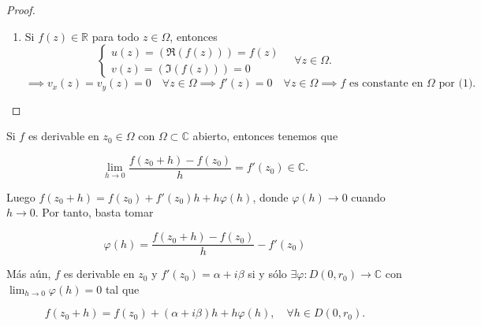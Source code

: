 \begin{proof}
\begin{enumerate}
\begin{itemize}
\[\begin{cases}
                    u(z) v(z) u_y(z) + v(z)^2 u_x(z) = 0 
                \end{cases}
            \]
            \[
                \implies u_x(z) (u^2(z) + v^2(z)) = 0 \implies u_x(z) c^2 = 0 \underbrace{\implies}_{c \neq 0} u_x(z) = 0 \quad \forall z \in \Omega.
            \]
            Análogamente, $v_x(z) = 0$ para todo $z \in \Omega$. Por lo tanto, $f'(z) = 0$ para todo $z \in \Omega$ y $f$ es constante en $\Omega$ por (1).
        \end{itemize}
        \item Si $f(z) \in \mathbb{R}$ para todo $z \in \Omega$, entonces 
        \[
            \begin{cases}
                u(z) = (\Re(f(z))) = f(z) \\
                v(z) = (\Im(f(z))) = 0
            \end{cases} \quad \forall z \in \Omega.
        \]
        \[
            \implies v_x(z) = v_y(z) = 0 \quad \forall z \in \Omega \implies f'(z) = 0 \quad \forall z \in \Omega \implies f \text{ es constante en } \Omega \text{ por (1).}
        \]
    \end{enumerate}

\end{proof}

Si $f$ es derivable en $z_0 \in \Omega$ con $\Omega \subset \mathbb{C}$ abierto, entonces tenemos que

\[
    \lim_{h \to 0} \frac{f(z_0 + h) - f(z_0)}{h} = f'(z_0) \in \mathbb{C}.
\]

Luego $f(z_0 + h) = f(z_0) + f'(z_0) h + h \varphi(h)$, donde $\varphi(h) \to 0$ cuando $h \to 0$. Por tanto, basta tomar 

\[
    \varphi(h) = \frac{f(z_0 + h) - f(z_0)}{h} - f'(z_0)
\]

Más aún, $f$ es derivable en $z_0$ y $f'(z_0) = \alpha + i \beta$ si y sólo $\exists \varphi : D(0,r_0) \to \mathbb{C}$ con $\lim_{h \to 0} \varphi(h) = 0$ tal que

\[
    f(z_0 + h) = f(z_0) + (\alpha + i \beta) h + h \varphi(h), \quad \forall h \in D(0,r_0).
\]

